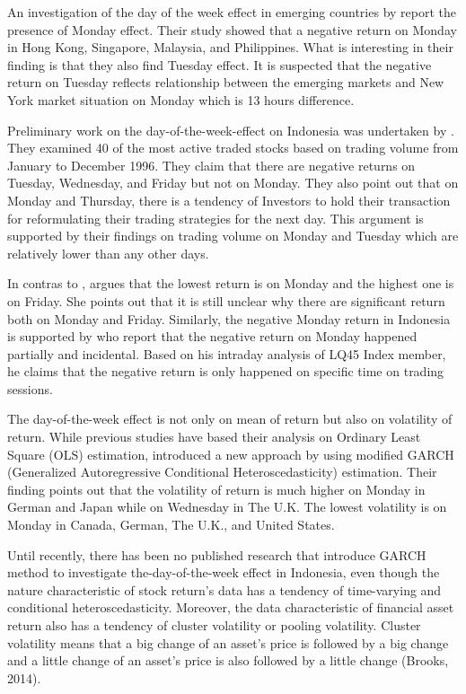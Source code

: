 \documentclass[12pt]{article}
\begin{document}
An investigation of the day of the week effect in emerging countries by \cite{Aggarwal1989} report the presence of Monday effect. Their study showed that a negative return on Monday in Hong Kong, Singapore, Malaysia, and Philippines. What is interesting in their finding is that they also find Tuesday effect. It is suspected that the negative return on Tuesday reflects relationship between the emerging markets and New York market situation on Monday which is 13 hours difference.

Preliminary work on the day-of-the-week-effect on Indonesia was undertaken by \cite{Tandelilin1999}. They examined 40 of the most active traded stocks based on trading volume from January to December 1996. They claim that there are negative returns on Tuesday, Wednesday, and Friday but not on Monday. They also point out that on Monday and Thursday, there is a tendency of Investors to hold their transaction for reformulating their trading strategies for the next day. This argument is supported by their findings on trading volume on Monday and Tuesday which are relatively lower than any other days.

In contras to \cite{Tandelilin1999}, \cite{Cahyaningdyah2005} argues that the lowest return is on Monday and the highest one is on Friday. She points out that it is still unclear why there are significant return both on Monday and Friday.
Similarly, the negative Monday return in Indonesia is supported by \cite{Sumiayana2007, Sumiyana2008} who report that the negative return on Monday happened partially and incidental. Based on his intraday analysis of LQ45 Index member, he claims that the negative return is only happened on specific time on trading sessions. 

The day-of-the-week effect is not only on mean of return but also on volatility of return.  While previous studies have based their analysis on Ordinary Least Square (OLS) estimation, \cite{Berument2001, Berument2012} introduced a new approach by using modified GARCH (Generalized Autoregressive Conditional Heteroscedasticity) estimation. Their finding points out that the volatility of return is much higher on Monday in German and Japan while on Wednesday in The U.K. The lowest volatility is on Monday in Canada, German, The U.K., and United States.

Until recently, there has been no published research that introduce GARCH method to investigate the-day-of-the-week effect in Indonesia, even though the nature characteristic of stock return’s data has a tendency of time-varying and conditional heteroscedasticity. Moreover, the data characteristic of financial asset return also has a tendency of cluster volatility or pooling volatility. Cluster volatility means that a big change of an asset’s price is followed by a big change and a little change of an asset’s price is also followed by a little change (Brooks, 2014).
\end{document}
